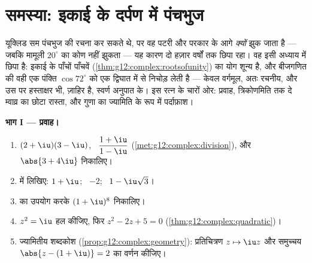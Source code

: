\section{समस्या: इकाई के दर्पण में पंचभुज}

\begin{problem}
\label{pb:g12:complex:1}
यूक्लिड सम पंचभुज की रचना कर सकते थे, पर वह पटरी और परकार के आगे \emph{क्यों}
झुक जाता है --- जबकि मामूली $20^\circ$ का कोण नहीं झुकता --- यह कारण दो हज़ार
वर्षों तक छिपा रहा। वह इसी अध्याय में छिपा है: इकाई के पाँचों पाँचवें 
(\cref{thm:g12:complex:rootsofunity}) का योग शून्य है, और बीजगणित की वही एक पंक्ति $\cos 72^\circ$ को एक द्विघात
 में से निचोड़ लेती है --- केवल वर्गमूल, अतः रचनीय, और उस पर हस्ताक्षर
भी, ज़ाहिर है, स्वर्ण अनुपात के। इस रत्न के चारों ओर: प्रवाह, त्रिकोणमिति तक
दे म्वाव्र का छोटा रास्ता, और गुणा का ज्यामिति के रूप में पर्दाफ़ाश।

\medskip
\noindent\textbf{भाग I --- प्रवाह।}
\begin{enumerate}
  \item $(2 + \iu)(3 - \iu)$, \ $\dfrac{1 + \iu}{1 - \iu}$ (\cref{met:g12:complex:division}), और $\abs{3 + 4\iu}$ निकालिए।
  \item {} में लिखिए: $1 + \iu$; \ $-2$; \ $1 - \iu\sqrt3$।
  \item {} का उपयोग करके $(1 + \iu)^8$ निकालिए।
  \item $z^2 = \iu$ हल कीजिए, फिर $z^2 - 2z + 5 = 0$ (\cref{thm:g12:complex:quadratic})।
  \item ज्यामितीय शब्दकोश (\cref{prop:g12:complex:geometry}): प्रतिचित्रण $z \mapsto \iu z$ और समुच्चय $\abs{z - (1 + \iu)} = 2$ का
        वर्णन कीजिए।
\end{enumerate}


\end{problem}

